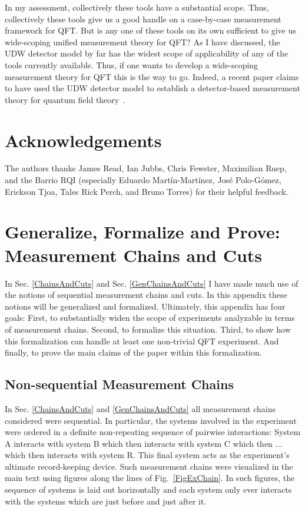 \documentclass[prd,twocolumn,superscriptaddress,floatfix,amsmath,amssymb,amsfonts,nofootinbib]{revtex4-2}
\begin{document}
In my assessment, collectively these tools have a substantial scope. Thus, collectively these tools give us a good handle on a case-by-case measurement framework for QFT. But is any one of these tools on its own sufficient to give us wide-scoping unified measurement theory for QFT? As I have discussed, the UDW detector model by far has the widest scope of applicability of any of the tools currently available. Thus, if one wants to develop a wide-scoping measurement theory for QFT this is the way to go. Indeed, a recent paper claims to have used the UDW detector model to establish a detector-based measurement theory for quantum field theory~\cite{pologomez2021detectorbased}.

\section{Acknowledgements}
The authors thanks James Read, Ian Jubbs, Chris Fewster, Maximilian Ruep, and the Barrio RQI (especially Eduardo Mart\'{i}n-Mart\'{i}nez, Jos\'{e} Polo-G\'{o}mez, Erickson Tjoa, Tales Rick Perch, and Bruno Torres) for their helpful feedback.

%



\appendix
\section{Generalize, Formalize and Prove: Measurement Chains and Cuts}\label{Appendix1}
In Sec. \ref{ChainsAndCuts} and Sec. \ref{GenChainsAndCuts} I have made much use of the notions of sequential measurement chains and cuts. In this appendix these notions will be generalized and formalized. Ultimately, this appendix has four goals: First, to substantially widen the scope of experiments analyzable in terms of measurement chains. Second, to formalize this situation. Third, to show how this formalization can handle at least one non-trivial QFT experiment. And finally, to prove the main claims of the paper within this formalization.

\subsection{Non-sequential Measurement Chains}
In Sec. \ref{ChainsAndCuts} and \ref{GenChainsAndCuts} all measurement chains considered were sequential. In particular, the systems involved in the experiment were ordered in a definite non-repeating sequence of pairwise interactions: System A interacts with system B which then interacts with system C which then ... which then interacts with system R. This final system acts as the experiment's ultimate record-keeping device. Such measurement chains were visualized in the main text using figures along the lines of Fig.~\ref{FigExChain}. In such figures, the sequence of systems is laid out horizontally and each system only ever interacts with the systems which are just before and just after it.
\end{document}
